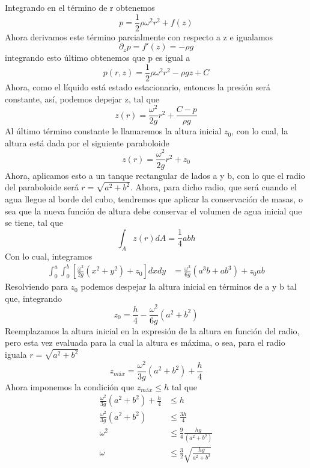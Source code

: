 \documentclass[11pt,letterpaper]{article}
\begin{document}
Integrando en el término de r obtenemos
\begin{equation*}
  p=\frac{1}{2}\rho\omega^2r^2 + f(z)
\end{equation*}
Ahora derivamos este término parcialmente con respecto a z e igualamos
\begin{equation*}
  \partial_zp=f'(z) = -\rho g
\end{equation*}
integrando esto último obtenemos que p es igual a 
\begin{equation}
  p(r,z)=\frac{1}{2}\rho\omega^2r^2 - \rho g z + C 
\end{equation}
Ahora, como el líquido está estado estacionario, entonces la presión será constante, así, podemos depejar z, tal que 
\begin{equation}
  z(r)=\frac{\omega^2}{2g}r^2 + \frac{C-p}{\rho g}
\end{equation}
Al último término constante le llamaremos la altura inicial $z_0$, con lo cual, la altura está dada por el siguiente paraboloide
\begin{equation}
  z(r)=\frac{\omega^2}{2g}r^2 + z_0
\end{equation}
Ahora, aplicamos esto a un tanque rectangular de lados a y b, con lo que el radio del paraboloide será $r=\sqrt{a^2+b^2}$. Ahora, para dicho radio, que será cuando el agua llegue al borde del cubo, tendremos que aplicar la conservación de masas, o sea que la nueva función de altura debe conservar el volumen de agua inicial que se tiene, tal que 
\begin{equation}
  \int_Az(r)dA = \frac{1}{4}abh
\end{equation}
Con lo cual, integramos
\begin{align*}
  \int_0^a\int_0^b\left[\frac{\omega^2}{2g}(x^2+y^2) + z_0 \right]dxdy & = \frac{\omega^2}{6g}(a^3b+ab^3) +z_0ab
\end{align*}
Resolviendo para $z_0$ podemos despejar la altura inicial en términos de a y b tal que, integrando
\begin{equation}
  z_0=\frac{h}{4}-\frac{\omega^2}{6g}(a^2+b^2)
\end{equation}
Reemplazamos la altura inicial en la expresión de la altura en función del radio, pero esta vez evaluada para la cual la altura es máxima, o sea, para el radio iguala $r=\sqrt{a^2+b^2}$
\begin{equation*}
  z_{máx}=\frac{\omega^2}{3g}(a^2+b^2) + \frac{h}{4}
\end{equation*}
Ahora imponemos la condición que $z_{máx}\leq h$ tal que
\begin{align*}
  \frac{\omega^2}{3g}(a^2+b^2) +\frac{h}{4} & \leq h \\
  \frac{\omega^2}{3g}(a^2+b^2) & \leq \frac{3h}{4} \\
  \omega^2 & \leq \frac{9}{4}\frac{hg}{(a^2+b^2)} \\
  \omega & \leq \frac{3}{2}\sqrt{\frac{hg}{a^2+b^2}}
\end{align*}
\end{document}
